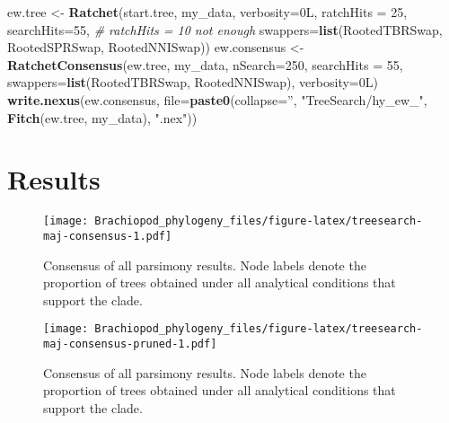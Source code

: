 \documentclass[openany]{book}
\newenvironment{Shaded}{\begin{snugshade}}{\end{snugshade}}
\newcommand{\KeywordTok}[1]{\textcolor[rgb]{0.13,0.29,0.53}{\textbf{#1}}}
\newcommand{\DataTypeTok}[1]{\textcolor[rgb]{0.13,0.29,0.53}{#1}}
\newcommand{\DecValTok}[1]{\textcolor[rgb]{0.00,0.00,0.81}{#1}}
\newcommand{\StringTok}[1]{\textcolor[rgb]{0.31,0.60,0.02}{#1}}
\newcommand{\CommentTok}[1]{\textcolor[rgb]{0.56,0.35,0.01}{\textit{#1}}}
\newcommand{\NormalTok}[1]{#1}
\theoremstyle{definition}
\theoremstyle{definition}
\theoremstyle{definition}
\theoremstyle{remark}
\begin{document}
\begin{Shaded}
\begin{Highlighting}[]
\NormalTok{ew.tree <-}\StringTok{ }\KeywordTok{Ratchet}\NormalTok{(start.tree, my_data, }\DataTypeTok{verbosity=}\NormalTok{0L,}
                   \DataTypeTok{ratchHits =} \DecValTok{25}\NormalTok{, }\DataTypeTok{searchHits=}\DecValTok{55}\NormalTok{, }\CommentTok{# ratchHits = 10 not enough}
                   \DataTypeTok{swappers=}\KeywordTok{list}\NormalTok{(RootedTBRSwap, RootedSPRSwap, RootedNNISwap))}
\NormalTok{ew.consensus <-}\StringTok{ }\KeywordTok{RatchetConsensus}\NormalTok{(ew.tree, my_data, }\DataTypeTok{nSearch=}\DecValTok{250}\NormalTok{, }\DataTypeTok{searchHits =} \DecValTok{55}\NormalTok{,}
                                 \DataTypeTok{swappers=}\KeywordTok{list}\NormalTok{(RootedTBRSwap, RootedNNISwap),}
                                 \DataTypeTok{verbosity=}\NormalTok{0L)}
\KeywordTok{write.nexus}\NormalTok{(ew.consensus, }\DataTypeTok{file=}\KeywordTok{paste0}\NormalTok{(}\DataTypeTok{collapse=}\StringTok{''}\NormalTok{, }\StringTok{"TreeSearch/hy_ew_"}\NormalTok{,}
                                      \KeywordTok{Fitch}\NormalTok{(ew.tree, my_data), }\StringTok{".nex"}\NormalTok{))}
\end{Highlighting}
\end{Shaded}

\section{Results}\label{results}






\begin{figure}
\centering
\texttt{[image: Brachiopod\_phylogeny\_files/figure-latex/treesearch-maj-consensus-1.pdf]}
\caption{\label{fig:treesearch-maj-consensus}Consensus of all parsimony results.
Node labels denote the proportion of trees obtained
under all analytical conditions that support the clade.}
\end{figure}




\begin{figure}
\centering
\texttt{[image: Brachiopod\_phylogeny\_files/figure-latex/treesearch-maj-consensus-pruned-1.pdf]}
\caption{\label{fig:treesearch-maj-consensus-pruned}Consensus of all parsimony results.
Node labels denote the proportion of trees obtained
under all analytical conditions that support the clade.}
\end{figure}
\end{document}
